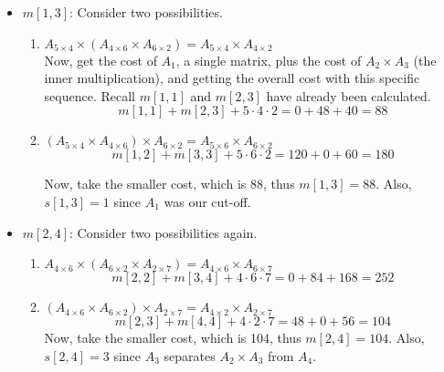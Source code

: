 \documentclass[12pt]{article}
\begin{document}
\begin{itemize}
    \item $m[1, 3]$: Consider two possibilities.
    \begin{enumerate}
        \item $A_{5 \times 4} \times ( A_{4 \times 6} \times A_{6 \times 2} ) = A_{5 \times 4} \times A_{4 \times 2}$\\
        Now, get the cost of $A_1$, a single matrix, plus the cost of $A_2 \times A_3$ (the inner multiplication), and getting the overall cost with this specific sequence. Recall $m[1, 1]$ and $m[2, 3]$ have already been calculated.
        \begin{equation*}
            m[1, 1] + m[2, 3] + 5\cdot4\cdot2 = 0 + 48 + 40 = 88
        \end{equation*}
        \item $( A_{5 \times 4} \times A_{4 \times 6} ) \times A_{6 \times 2} = A_{5 \times 6} \times A_{6 \times 2}$
        \begin{equation*}
            m[1, 2] + m[3, 3] + 5\cdot6\cdot2 = 120 + 0 + 60 = 180
        \end{equation*}
        
        Now, take the smaller cost, which is 88, thus $m[1, 3]=88$. Also, $s[1, 3]=1$ since $A_1$ was our cut-off.
    \end{enumerate}
    
    \item $m[2, 4]$: Consider two possibilities again.
    \begin{enumerate}
        \item $A_{4 \times 6} \times ( A_{6 \times 2} \times A_{2 \times 7} ) = A_{4 \times 6} \times A_{6 \times 7}$
        \begin{equation*}
            m[2, 2] + m[3, 4] + 4\cdot6\cdot7 = 0 + 84 + 168 = 252
        \end{equation*}
        \item $( A_{4 \times 6} \times A_{6 \times 2} ) \times A_{2 \times 7} = A_{4 \times 2} \times A_{2 \times 7}$
        \begin{equation*}
            m[2, 3] + m[4, 4] + 4\cdot2\cdot7 = 48 + 0 + 56 = 104
        \end{equation*}
        Now, take the smaller cost, which is 104, thus $m[2, 4]=104$. Also, $s[2, 4]=3$ since $A_3$ separates $A_2 \times A_3$ from $A_4$.
    \end{enumerate}
\end{itemize}
\end{document}
